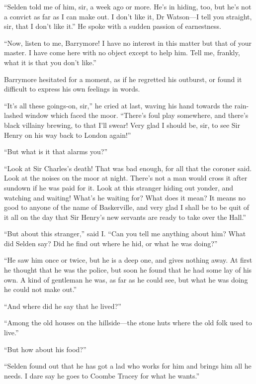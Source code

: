 \documentclass[paper=5.5in:8.5in,BCOR=7mm,twoside,DIV=calc,12pt,usegeometry,openany,chapterprefix,endperiod]{scrbook} %
\begin{document}
\enquote{Selden told me of him, sir, a week ago or more. He's in hiding, too, but he's not a convict as far as I can make out. I don't like it, Dr Watson\nobreakdash---I tell you straight, sir, that I don't like it.} He spoke with a sudden passion of earnestness.

\enquote{Now, listen to me, Barrymore! I have no interest in this matter but that of your master. I have come here with no object except to help him. Tell me, frankly, what it is that you don't like.}

Barrymore hesitated for a moment, as if he regretted his outburst, or found it difficult to express his own feelings in words.

\enquote{It's all these goings-on, sir,} he cried at last, waving his hand towards the rain-lashed window which faced the moor. \enquote{There's foul play somewhere, and there's black villainy brewing, to that I'll swear! Very glad I should be, sir, to see Sir Henry on his way back to London again!}

\enquote{But what is it that alarms you?}

\enquote{Look at Sir Charles's death! That was bad enough, for all that the coroner said. Look at the noises on the moor at night. There's not a man would cross it after sundown if he was paid for it. Look at this stranger hiding out yonder, and watching and waiting! What's he waiting for? What does it mean? It means no good to anyone of the name of Baskerville, and very glad I shall be to be quit of it all on the day that Sir Henry's new servants are ready to take over the Hall.}

\enquote{But about this stranger,} said I. \enquote{Can you tell me anything about him? What did Selden say? Did he find out where he hid, or what he was doing?}

\enquote{He saw him once or twice, but he is a deep one, and gives nothing away. At first he thought that he was the police, but soon he found that he had some lay of his own. A kind of gentleman he was, as far as he could see, but what he was doing he could not make out.}

\enquote{And where did he say that he lived?}

\enquote{Among the old houses on the hillside\nobreakdash---the stone huts where the old folk used to live.}

\enquote{But how about his food?}

\enquote{Selden found out that he has got a lad who works for him and brings him all he needs. I dare say he goes to Coombe Tracey for what he wants.}
\end{document}
